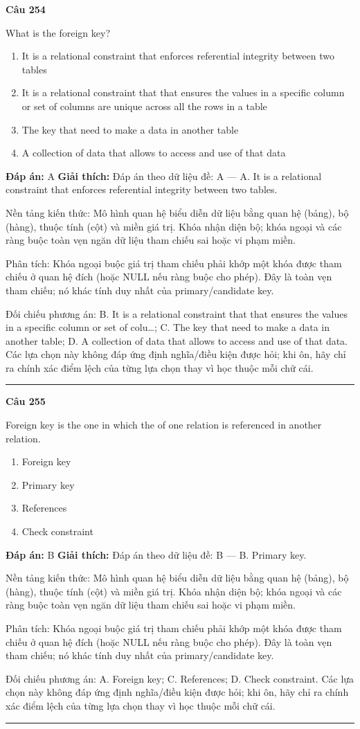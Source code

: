 \documentclass[11pt,a4paper]{article}
\newenvironment{question}[1]{%
  \par\vspace{1em}\noindent\textbf{\large Câu #1}\par\vspace{0.4em}
}{%
  \par\vspace{1em}\hrule\vspace{0.6em}
}
\newenvironment{choices}{%
  \begin{enumerate}[label=\textbf{\Alph*.},leftmargin=2.2em,itemsep=2pt,topsep=3pt]
}{%
  \end{enumerate}
}
\newcommand{\choice}{\item}
\begin{document}
\begin{question}{254}
What is the foreign key?
\begin{choices}
\choice It is a relational constraint that enforces referential integrity between two tables
\choice It is a relational constraint that that ensures the values in a specific column or set of columns are unique across all the rows in a table
\choice The key that need to make a data in another table
\choice A collection of data that allows to access and use of that data
\end{choices}
\textbf{Đáp án:} A
\textbf{Giải thích:} Đáp án theo dữ liệu đề: A — A. It is a relational constraint that enforces referential integrity between two tables.

Nền tảng kiến thức: Mô hình quan hệ biểu diễn dữ liệu bằng quan hệ (bảng), bộ (hàng), thuộc tính (cột) và miền giá trị. Khóa nhận diện bộ; khóa ngoại và các ràng buộc toàn vẹn ngăn dữ liệu tham chiếu sai hoặc vi phạm miền.

Phân tích: Khóa ngoại buộc giá trị tham chiếu phải khớp một khóa được tham chiếu ở quan hệ đích (hoặc NULL nếu ràng buộc cho phép). Đây là toàn vẹn tham chiếu; nó khác tính duy nhất của primary/candidate key.

Đối chiếu phương án: B. It is a relational constraint that that ensures the values in a specific column or set of colu…; C. The key that need to make a data in another table; D. A collection of data that allows to access and use of that data. Các lựa chọn này không đáp ứng định nghĩa/điều kiện được hỏi; khi ôn, hãy chỉ ra chính xác điểm lệch của từng lựa chọn thay vì học thuộc mỗi chữ cái.
\end{question}

\begin{question}{255}
Foreign key is the one in which the
of one relation is referenced in another relation.
\begin{choices}
\choice Foreign key
\choice Primary key
\choice References
\choice Check constraint
\end{choices}
\textbf{Đáp án:} B
\textbf{Giải thích:} Đáp án theo dữ liệu đề: B — B. Primary key.

Nền tảng kiến thức: Mô hình quan hệ biểu diễn dữ liệu bằng quan hệ (bảng), bộ (hàng), thuộc tính (cột) và miền giá trị. Khóa nhận diện bộ; khóa ngoại và các ràng buộc toàn vẹn ngăn dữ liệu tham chiếu sai hoặc vi phạm miền.

Phân tích: Khóa ngoại buộc giá trị tham chiếu phải khớp một khóa được tham chiếu ở quan hệ đích (hoặc NULL nếu ràng buộc cho phép). Đây là toàn vẹn tham chiếu; nó khác tính duy nhất của primary/candidate key.

Đối chiếu phương án: A. Foreign key; C. References; D. Check constraint. Các lựa chọn này không đáp ứng định nghĩa/điều kiện được hỏi; khi ôn, hãy chỉ ra chính xác điểm lệch của từng lựa chọn thay vì học thuộc mỗi chữ cái.
\end{question}
\end{document}
